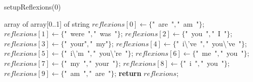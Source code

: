 \documentclass[a4paper,10pt]{article}
\begin{document}
\begin{algorithm}
\caption{setupReflexions(0)}
\begin{algorithmic}[5]
\State {}
    \State array of array[0..1] of string
  \EndDecl
  \State \(reflexions[0]\gets\{\)"{}\ are\ "{}\(,\)"{}\ am\ "{}\(\}\);
  \State \(reflexions[1]\gets\{\)"{}\ were\ "{}\(,\)"{}\ was\ "{}\(\}\);
  \State \(reflexions[2]\gets\{\)"{}\ you\ "{}\(,\)"{}\ I\ "{}\(\}\);
  \State \(reflexions[3]\gets\{\)"{}\ your"{}\(,\)"{}\ my"{}\(\}\);
  \State \(reflexions[4]\gets\{\)"{}\ i\textbackslash{}'{}ve\ "{}\(,\)"{}\ you\textbackslash{}'{}ve\ "{}\(\}\);
  \State \(reflexions[5]\gets\{\)"{}\ i\textbackslash{}'{}m\ "{}\(,\)"{}\ you\textbackslash{}'{}re\ "{}\(\}\);
  \State \(reflexions[6]\gets\{\)"{}\ me\ "{}\(,\)"{}\ you\ "{}\(\}\);
  \State \(reflexions[7]\gets\{\)"{}\ my\ "{}\(,\)"{}\ your\ "{}\(\}\);
  \State \(reflexions[8]\gets\{\)"{}\ i\ "{}\(,\)"{}\ you\ "{}\(\}\);
  \State \(reflexions[9]\gets\{\)"{}\ am\ "{}\(,\)"{}\ are\ "{}\(\}\);
  \State \textbf{return} \(reflexions\);
\EndFunction
\end{algorithmic}
\end{algorithm}
\end{document}
